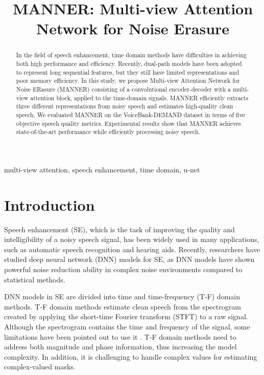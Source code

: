 \documentclass{article}
\title{MANNER: Multi-view Attention Network for Noise Erasure}
\begin{document}
\maketitle

\begin{abstract}
In the field of speech enhancement, time domain methods have difficulties in achieving both high performance and efficiency. Recently, dual-path models have been adopted to represent long sequential features, but they still have limited representations and poor memory efficiency. In this study, we propose Multi-view Attention Network for Noise ERasure (MANNER) consisting of a convolutional encoder-decoder with a multi-view attention block, applied to the time-domain signals. MANNER efficiently extracts three different representations from noisy speech and estimates high-quality clean speech. We evaluated MANNER on the VoiceBank-DEMAND dataset in terms of five objective speech quality metrics. Experimental results show that MANNER achieves state-of-the-art performance while efficiently processing noisy speech.
\end{abstract}

\begin{keywords}
multi-view attention, speech enhancement, time domain, u-net
\end{keywords}


\section{Introduction}
\label{sec:intro}

Speech enhancement (SE), which is the task of improving the quality and intelligibility of a noisy speech signal, has been widely used in many applications, such as automatic speech recognition and hearing aids. Recently, researchers have studied deep neural network (DNN) models for SE, as DNN models have shown powerful noise reduction ability in complex noise environments compared to statistical methods.

DNN models in SE are divided into time and time-frequency (T-F) domain methods. T-F domain methods \cite{choi2019phaseaware, fu2019metricgan, fu2021metricgan+, yin2020phasen, zheng2020interactive} estimate clean speech from the spectrogram created by applying the short-time Fourier transform (STFT) to a raw signal. Although the spectrogram contains the time and frequency of the signal, some limitations have been pointed out to use it \cite{wang2021tstnn, rethage2018wavenet}. T-F domain methods need to address both magnitude and phase information, thus increasing the model complexity. In addition, it is challenging to handle complex values for estimating complex-valued masks.
\end{document}
